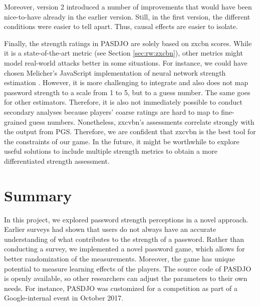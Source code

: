 Moreover, version 2 introduced a number of improvements that would have been nice-to-have already in the earlier version. Still, in the first version, the different conditions were easier to tell apart. Thus, causal effects are easier to isolate. 

Finally, the strength ratings in PASDJO are solely based on zxcbn scores. While it is a state-of-the-art metric (see Section \ref{sec:rw:zxcbn}), other metrics might model real-world attacks better in some situations. For instance, we could have chosen Melicher's JavaScript implementation of neural network strength estimation \cite{Melicher2016NeuralNetworks}. However, it is more challenging to integrate and also does not map password strength to a scale from 1 to 5, but to a guess number. The same goes for other estimators. Therefore, it is also not immediately possible to conduct secondary analyses because players' coarse ratings are hard to map to fine-grained guess numbers. Nonetheless, zxcvbn's assessments correlate strongly with the output from \gls{PGS}. Therefore, we are confident that zxcvbn is the best tool for the constraints of our game. In the future, it might be worthwhile to explore useful solutions to include multiple strength metrics to obtain a more differentiated strength assessment.

\section{Summary}
In this project, we explored password strength perceptions in a novel approach. Earlier surveys had shown that users do not always have an accurate understanding of what contributes to the strength of a password. Rather than conducting a survey, we implemented a novel password game, which allows for better randomization of the measurements. Moreover, the game has unique potential to measure learning effects of the players. The source code of PASDJO is openly available, so other researchers can adjust the parameters to their own needs. For instance, PASDJO was customized for a competition as part of a Google-internal event in October 2017. 

